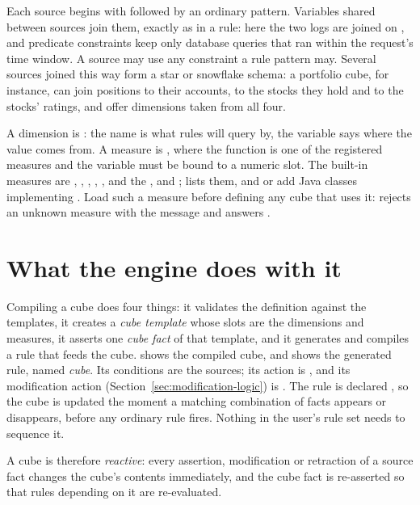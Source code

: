Each source begins with \fn{<-} followed by an ordinary pattern. Variables
shared between sources join them, exactly as in a rule: here the two logs
are joined on , and predicate constraints keep only
database queries that ran within the request's time window. A source may
use any constraint a rule pattern may. Several sources joined this way
form a star or snowflake schema: a portfolio cube, for instance, can join
positions to their accounts, to the stocks they hold and to the stocks'
ratings, and offer dimensions taken from all four.

A dimension is : the name is what rules
will query by, the variable says where the value comes from. A measure is
, where the function is one of the
registered measures and the variable must be bound to a numeric slot. The
built-in measures are , , , ,
,  and the ,  and ;
 lists them, and  or
 add Java classes implementing
. Load such a measure before
defining any cube that uses it:  rejects an unknown measure
with the message  and answers
.

\section{What the engine does with it}

Compiling a cube does four things: it validates the definition against the
templates, it creates a \emph{cube template} whose slots are the
dimensions and measures, it asserts one \emph{cube fact} of that template,
and it generates and compiles a rule that feeds the cube. 
shows the compiled cube, and  shows the generated rule, named
\emph{cube}. Its conditions are the sources;
its action is , and its
modification action (Section~\ref{sec:modification-logic}) is
. The rule is declared
, so the cube is updated the moment a matching combination
of facts appears or disappears, before any ordinary rule fires. Nothing in
the user's rule set needs to sequence it.

A cube is therefore \emph{reactive}: every assertion, modification or
retraction of a source fact changes the cube's contents immediately, and
the cube fact is re-asserted so that rules depending on it are
re-evaluated.

